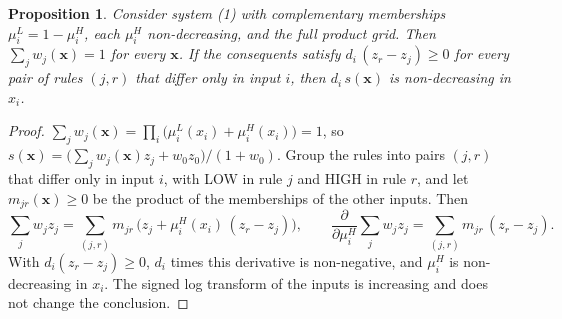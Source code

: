 
\newtheorem{proposition}{Proposition}

\begin{minipage}{15.4cm}
\begin{proposition}
Consider system (1) with complementary memberships $\mu_i^L = 1 - \mu_i^H$, each $\mu_i^H$ non-decreasing, and the full product grid. Then $\sum_j w_j(\mathbf{x}) = 1$ for every $\mathbf{x}$. If the consequents satisfy $d_i\,(z_r - z_j) \ge 0$ for every pair of rules $(j, r)$ that differ only in input $i$, then $d_i\, s(\mathbf{x})$ is non-decreasing in $x_i$.
\end{proposition}
\begin{proof}
$\sum_j w_j(\mathbf{x}) = \prod_i \big(\mu_i^L(x_i) + \mu_i^H(x_i)\big) = 1$, so $s(\mathbf{x}) = \big(\sum_j w_j(\mathbf{x}) z_j + w_0 z_0\big)/(1 + w_0)$. Group the rules into pairs $(j, r)$ that differ only in input $i$, with LOW in rule $j$ and HIGH in rule $r$, and let $m_{jr}(\mathbf{x}) \ge 0$ be the product of the memberships of the other inputs. Then
\[
\textstyle\sum_j w_j z_j = \sum_{(j,r)} m_{jr}\,\big(z_j + \mu_i^H(x_i)\,(z_r - z_j)\big),
\qquad
\frac{\partial}{\partial \mu_i^H}\textstyle\sum_j w_j z_j = \sum_{(j,r)} m_{jr}\,(z_r - z_j).
\]
With $d_i (z_r - z_j) \ge 0$, $d_i$ times this derivative is non-negative, and $\mu_i^H$ is non-decreasing in $x_i$. The signed log transform of the inputs is increasing and does not change the conclusion.
\end{proof}
\end{minipage}


